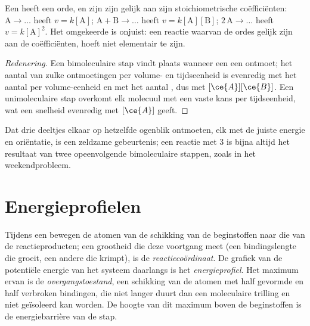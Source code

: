 \begin{proposition}\label{prop:b1:elementary-steps:elementary-law}
Een  heeft een orde, en zijn  zijn gelijk
aan zijn stoichiometrische coëfficiënten: $\mathrm{A} \to \dots$ heeft
$v = k[\mathrm{A}]$;
$\mathrm{A} + \mathrm{B} \to \dots$ heeft $v = k[\mathrm{A}][\mathrm{B}]$;
$2\,\mathrm{A} \to \dots$ heeft $v = k[\mathrm{A}]^2$. Het omgekeerde is
onjuist: een reactie waarvan de ordes gelijk zijn aan de coëfficiënten,
hoeft niet elementair te zijn.
\end{proposition}

\begin{proof}[Redenering]
Een bimoleculaire stap vindt plaats wanneer een  een 
ontmoet; het aantal van zulke ontmoetingen per volume- en tijdseenheid is
evenredig met het aantal  per volume-eenheid en met het aantal
, dus met
$[\ce{A}][\ce{B}]$. Een unimoleculaire stap overkomt elk molecuul met een
vaste kans per tijdseenheid, wat een snelheid evenredig met $[\ce{A}]$
geeft.
\end{proof}

\begin{remark}\label{rem:b1:elementary-steps:termolecular}
Dat drie deeltjes elkaar op hetzelfde ogenblik ontmoeten, elk met de
juiste energie en oriëntatie, is een zeldzame gebeurtenis; een reactie
met  3 is bijna altijd het resultaat van twee opeenvolgende
bimoleculaire stappen, zoals in het weekendprobleem.
\end{remark}

\section{Energieprofielen}

\begin{definition}\label{def:b1:elementary-steps:energy-profile}
Tijdens een  bewegen de atomen van de schikking van de
beginstoffen naar die van de reactieproducten; een grootheid die deze
voortgang meet (een bindingslengte die groeit, een andere die krimpt), is
de \emph{reactiecoördinaat}.
De grafiek van de potentiële energie van het systeem daarlangs is het
\emph{energieprofiel}. Het maximum ervan is de
\emph{overgangstoestand}, een schikking van de
atomen met half gevormde en half verbroken bindingen, die niet langer
duurt dan een moleculaire trilling en niet geïsoleerd kan worden. De
hoogte van dit maximum boven de beginstoffen is de energiebarrière van de
stap.
\end{definition}

